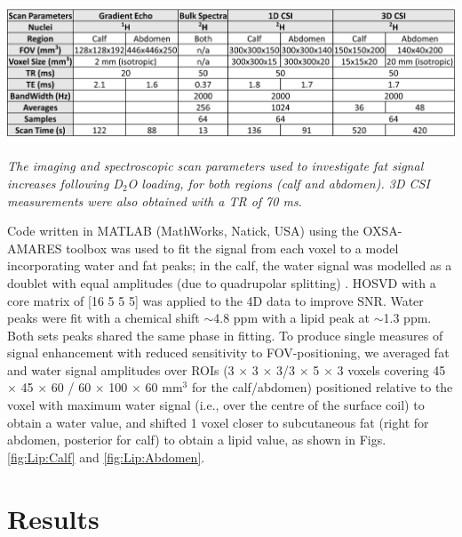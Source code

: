 \begin{table}
    \centering
    \includegraphics[width=1\textwidth]{Figures/Lipid/Scan_Details.png}
    \caption{\textit{The imaging and spectroscopic scan parameters used to investigate fat signal increases following D$_2$O loading, for both regions (calf and abdomen). 3D CSI measurements were also obtained with a \ac{TR} of 70 ms.}}
    \label{fig:Lip:Scan_Detail}
\end{table}

Code written in MATLAB (MathWorks, Natick, USA) using the OXSA-AMARES \cite{Purvis2017OXSA:MATLAB} toolbox was used to fit the signal from each voxel to a model incorporating water and fat peaks; in the calf, the water signal was modelled as a doublet with equal amplitudes (due to quadrupolar splitting) \cite{Gursan2022ResidualMuscle}. \ac{HOSVD} \cite{Bader2007EfficientTensors} with a core matrix of [16 5 5 5] was applied to the 4D data to improve \ac{SNR}. Water peaks were fit with a chemical shift $\sim$4.8 ppm with a lipid peak at $\sim$1.3 ppm. Both sets peaks shared the same phase in fitting. To produce single measures of signal enhancement with reduced sensitivity to \ac{FOV}-positioning, we averaged fat and water signal amplitudes over \ac{ROI}s (3 $\times$ 3 $\times$ 3/3 $\times$ 5 $\times$ 3 voxels covering 45 $\times$ 45 $\times$ 60 / 60 $\times$ 100 $\times$ 60 mm$^3$ for the calf/abdomen) positioned relative to the voxel with maximum water signal (i.e., over the centre of the surface coil) to obtain a water value, and shifted 1 voxel closer to subcutaneous fat (right for abdomen, posterior for calf) to obtain a lipid value, as shown in Figs. \ref{fig:Lip:Calf} and \ref{fig:Lip:Abdomen}.

\section{Results}


